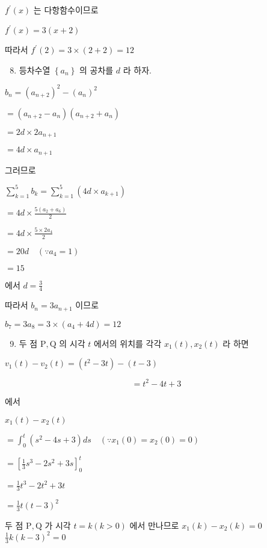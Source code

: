 \documentclass[10pt]{article}
\begin{document}
\(f^{\prime}(x)\) 는 다항함수이므로

\(f^{\prime}(x)=3(x+2)\)

따라서 \(f^{\prime}(2)=3 \times(2+2)=12\)

\begin{enumerate}
  \setcounter{enumi}{7}
  \item 등차수열 \(\left\{a_{n}\right\}\) 의 공차를 \(d\) 라 하자.
\end{enumerate}

\(b_{n}=\left(a_{n+2}\right)^{2}-\left(a_{n}\right)^{2}\)

\(=\left(a_{n+2}-a_{n}\right)\left(a_{n+2}+a_{n}\right)\)

\(=2 d \times 2 a_{n+1}\)

\(=4 d \times a_{n+1}\)

그러므로

\(\sum_{k=1}^{5} b_{k}=\sum_{k=1}^{5}\left(4 d \times a_{k+1}\right)\)

\(=4 d \times \frac{5\left(a_{2}+a_{6}\right)}{2}\)

\(=4 d \times \frac{5 \times 2 a_{4}}{2}\)

\(=20 d \quad\left(\because a_{4}=1\right)\)

\(=15\)

에서 \(d=\frac{3}{4}\)

따라서 \(b_{n}=3 a_{n+1}\) 이므로

\(b_{7}=3 a_{8}=3 \times\left(a_{4}+4 d\right)=12\)

\begin{enumerate}
  \setcounter{enumi}{8}
  \item 두 점 \(\mathrm{P}, \mathrm{Q}\) 의 시각 \(t\) 에서의 위치를 각각 \(x_{1}(t), x_{2}(t)\) 라 하면
\end{enumerate}

\(v_{1}(t)-v_{2}(t)=\left(t^{2}-3 t\right)-(t-3)\)

\[
=t^{2}-4 t+3
\]

에서

\(x_{1}(t)-x_{2}(t)\)

\(=\int_{0}^{t}\left(s^{2}-4 s+3\right) d s \quad\left(\because x_{1}(0)=x_{2}(0)=0\right)\)

\(=\left[\frac{1}{3} s^{3}-2 s^{2}+3 s\right]_{0}^{t}\)

\(=\frac{1}{3} t^{3}-2 t^{2}+3 t\)

\(=\frac{1}{3} t(t-3)^{2}\)

두 점 \(\mathrm{P}, \mathrm{Q}\) 가 시각 \(t=k(k>0)\) 에서 만나므로 \(x_{1}(k)-x_{2}(k)=0\) \(\frac{1}{3} k(k-3)^{2}=0\)
\end{document}
